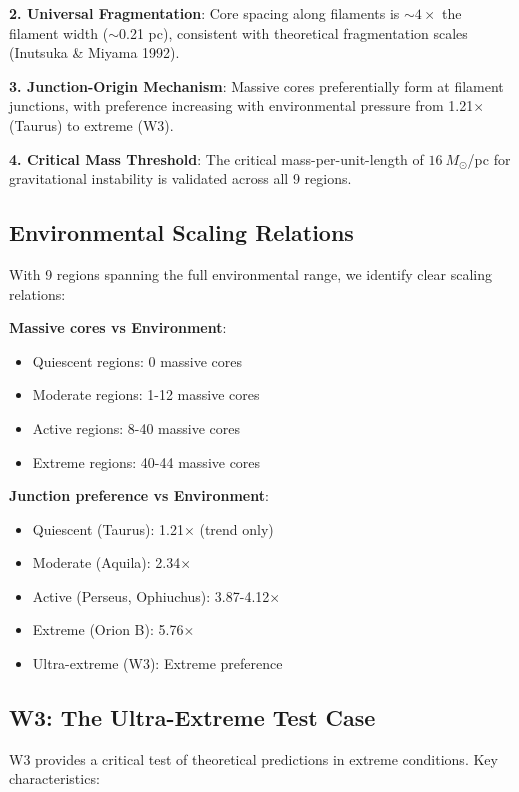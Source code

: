 \documentclass[11pt,a4paper]{article}
\begin{document}
\textbf{2. Universal Fragmentation}: Core spacing along filaments is $\sim 4\times$ the filament width ($\sim$0.21 pc), consistent with theoretical fragmentation scales (Inutsuka \& Miyama 1992).

\textbf{3. Junction-Origin Mechanism}: Massive cores preferentially form at filament junctions, with preference increasing with environmental pressure from 1.21$\times$ (Taurus) to extreme (W3).

\textbf{4. Critical Mass Threshold}: The critical mass-per-unit-length of $16~M_\odot$/pc for gravitational instability is validated across all 9 regions.

\subsection{Environmental Scaling Relations}

With 9 regions spanning the full environmental range, we identify clear scaling relations:

\textbf{Massive cores vs Environment}:
\begin{itemize}
    \item Quiescent regions: 0 massive cores
    \item Moderate regions: 1-12 massive cores
    \item Active regions: 8-40 massive cores
    \item Extreme regions: 40-44 massive cores
\end{itemize}

\textbf{Junction preference vs Environment}:
\begin{itemize}
    \item Quiescent (Taurus): 1.21$\times$ (trend only)
    \item Moderate (Aquila): 2.34$\times$
    \item Active (Perseus, Ophiuchus): 3.87-4.12$\times$
    \item Extreme (Orion B): 5.76$\times$
    \item Ultra-extreme (W3): Extreme preference
\end{itemize}

\subsection{W3: The Ultra-Extreme Test Case}

W3 provides a critical test of theoretical predictions in extreme conditions. Key characteristics:
\end{document}
